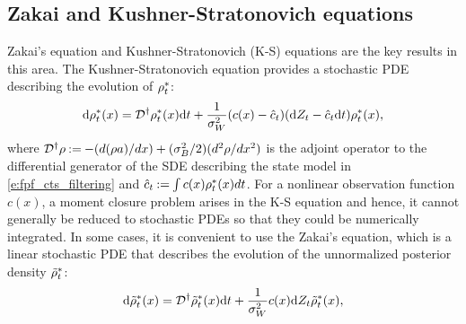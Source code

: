 \subsection{Zakai and Kushner-Stratonovich equations}
Zakai's equation \cite{zak69} and Kushner-Stratonovich (K-S) \cite{kus67, str60} equations are the key results in this area. 
The Kushner-Stratonovich equation provides a stochastic PDE describing the evolution of $\rho^*_t$:
\begin{equation}
\ud \pr^*_t(x) = \generate^\dagger \pr^*_t(x) \ud t + \frac{1}{\sigma^2_W} (c(x) - \hat{c}_t) (\ud Z_t - \hat{c}_t\ud t) \pr^*_t(x),
\label{e:fpf_kushner_stratonovich}
\end{equation}
where ${\cal D}^\dagger \rho \mathbin{:=} - (d(\rho a) / dx) + (\sigma^2_B/2) (d^2 \rho /d x^2)$ is the adjoint operator to the differential generator of the SDE describing the state model in \eqref{e:fpf_cts_filtering} and ${\hat c}_t \mathbin{:=} \int c(x) \rho^*_t(x) dt$. 
For a nonlinear observation function $c(x)$, a moment closure problem arises in the K-S equation and hence, it cannot generally be reduced to stochastic PDEs so that they could be numerically integrated. In some cases, it is convenient to use the Zakai's equation, which is a linear stochastic PDE that describes the evolution of the unnormalized posterior density $\tilde{\rho}^*_t$: 
\begin{equation}
\ud \tilde{\pr}^*_t(x) = \generate^\dagger \tilde{\pr}^*_t(x) \ud t + \frac{1}{\sigma^2_W}  c(x) \ud Z_t \tilde{\pr}^*_t(x), 
\label{e:fpf_zakai}
\end{equation}

